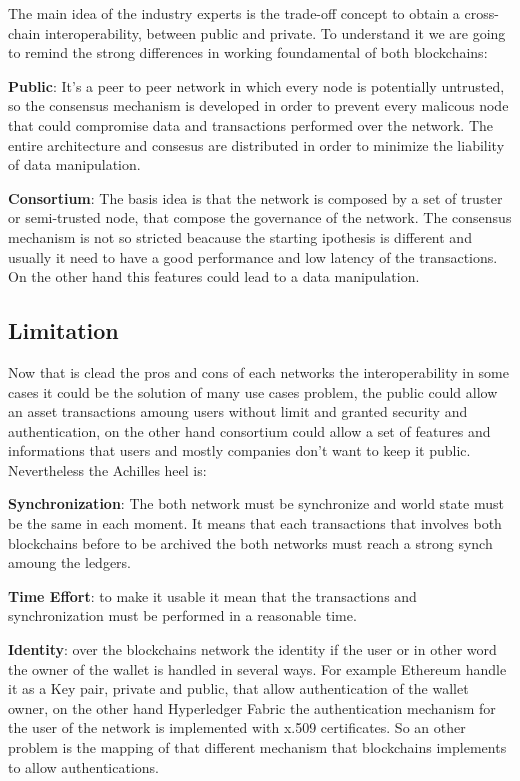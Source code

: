The main idea of the industry experts is the trade-off concept to obtain a cross-chain interoperability,
between public and private. To understand it we are going to remind the strong differences in working 
foundamental of both blockchains:

\begin{outline}
    \1 \textbf{Public}: It's a peer to peer network in which every node is potentially untrusted, so
    the consensus mechanism is developed in order to prevent every malicous node that could compromise
    data and transactions performed over the network. The entire architecture and consesus are distributed
    in order to minimize the liability of data manipulation.

    \1 \textbf{Consortium}: The basis idea is that the network is composed by a set of truster or semi-trusted
    node, that compose the governance of the network. The consensus mechanism is not so stricted beacause 
    the starting ipothesis is different and usually it need to have a good performance and low latency of
    the transactions. On the other hand this features could lead to a data manipulation. 

\end{outline}

\subsection{Limitation}

Now that is clead the pros and cons of each networks the interoperability in some cases it could be 
the solution of many use cases problem, the public could allow an asset transactions amoung users without
limit and granted security and authentication, on the other hand consortium could allow a set of features
and informations that users and mostly companies don't want to keep it public. Nevertheless the 
Achilles heel is:


\begin{outline}
    \1 \textbf{Synchronization}: The both network must be synchronize and world state must be the same
    in each moment. It means that each transactions that involves both blockchains before to be archived
    the both networks must reach a strong synch amoung the ledgers.  

    \1 \textbf{Time Effort}: to make it usable it mean that the transactions and synchronization
    must be performed in a reasonable time.
    
    \1 \textbf{Identity}: over the blockchains network the identity if the user or in other word 
    the owner of the wallet is handled in several ways. For example Ethereum handle it as a Key pair,
    private and public, that allow authentication of the wallet owner, on the other hand Hyperledger
    Fabric the authentication mechanism for the user of the network is implemented with x.509 certificates.
    So an other problem is the mapping of that different mechanism that blockchains implements to allow
    authentications. 
\end{outline}


